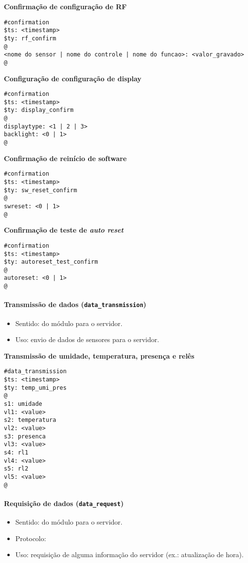 \textbf{Confirmação de configuração de RF}
\begin{lstlisting}
#confirmation
$ts: <timestamp>
$ty: rf_confirm
@
<nome do sensor | nome do controle | nome do funcao>: <valor_gravado>
@
\end{lstlisting}

\textbf{Configuração de configuração de display}
\begin{lstlisting}
#confirmation
$ts: <timestamp>
$ty: display_confirm
@
displaytype: <1 | 2 | 3>
backlight: <0 | 1>
@
\end{lstlisting}

\textbf{Confirmação de reinício de software}
\begin{lstlisting}
#confirmation
$ts: <timestamp>
$ty: sw_reset_confirm
@
swreset: <0 | 1>
@
\end{lstlisting}

\textbf{Confirmação de teste de \emph{auto reset}}
\begin{lstlisting}
#confirmation
$ts: <timestamp>
$ty: autoreset_test_confirm
@
autoreset: <0 | 1>
@
\end{lstlisting}

\paragraph{Transmissão de dados (\texttt{data\_transmission})}
\begin{itemize}
\item Sentido: do módulo para o servidor.
\item Uso: envio de dados de sensores para o servidor.
\end{itemize}

\textbf{Transmissão de umidade, temperatura, presença e relês}
\begin{lstlisting}
#data_transmission
$ts: <timestamp>
$ty: temp_umi_pres
@
s1: umidade
vl1: <value>
s2: temperatura
vl2: <value>
s3: presenca
vl3: <value>
s4: rl1
vl4: <value>
s5: rl2
vl5: <value>
@
\end{lstlisting}

\paragraph{Requisição de dados (\texttt{data\_request})}
\begin{itemize}
\item Sentido: do módulo para o servidor.
\item Protocolo: \wmqtt{}
\item Uso: requisição de alguma informação do servidor (ex.: atualização de hora).
\end{itemize}


